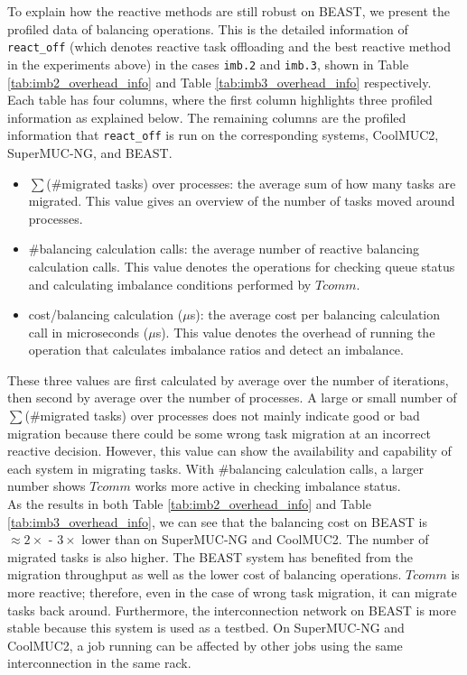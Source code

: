 To explain how the reactive methods are still robust on BEAST, we present the profiled data of balancing operations. This is the detailed information of \texttt{react\_off} (which denotes reactive task offloading and the best reactive method in the experiments above) in the cases \texttt{imb.2} and \texttt{imb.3}, shown in Table \ref{tab:imb2_overhead_info} and Table \ref{tab:imb3_overhead_info} respectively. Each table has four columns, where the first column highlights three profiled information as explained below. The remaining columns are the profiled information that \texttt{react\_off} is run on the corresponding systems, CoolMUC2, SuperMUC-NG, and BEAST.
\begin{itemize}
	\item $\sum$(\#migrated tasks) over processes: the average sum of how many tasks are migrated. This value gives an overview of the number of tasks moved around processes.
	\item \#balancing calculation calls: the average number of reactive balancing calculation calls. This value denotes the operations for checking queue status and calculating imbalance conditions performed by $Tcomm$.
	\item cost/balancing calculation ($\mu$s): the average cost per balancing calculation call in microseconds ($\mu$s). This value denotes the overhead of running the operation that calculates imbalance ratios and detect an imbalance.
\end{itemize}

These three values are first calculated by average over the number of iterations, then second by average over the number of processes. A large or small number of $\sum$(\#migrated tasks) over processes does not mainly indicate good or bad migration because there could be some wrong task migration at an incorrect reactive decision. However, this value can show the availability and capability of each system in migrating tasks. With \#balancing calculation calls, a larger number shows $Tcomm$ works more active in checking imbalance status. \\

As the results in both Table \ref{tab:imb2_overhead_info} and Table \ref{tab:imb3_overhead_info}, we can see that the balancing cost on BEAST is $\approx 2\times$ - $3\times$ lower than on SuperMUC-NG and CoolMUC2. The number of migrated tasks is also higher. The BEAST system has benefited from the migration throughput as well as the lower cost of balancing operations. $Tcomm$ is more reactive; therefore, even in the case of wrong task migration, it can migrate tasks back around. Furthermore, the interconnection network on BEAST is more stable because this system is used as a testbed. On SuperMUC-NG and CoolMUC2, a job running can be affected by other jobs using the same interconnection in the same rack.

